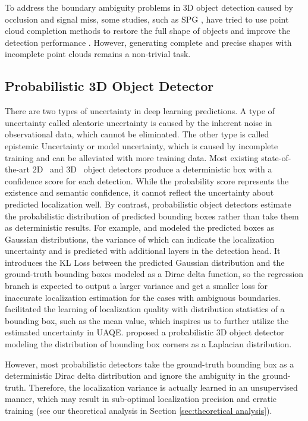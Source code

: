 \documentclass[twocolumn]{svjour3}
\begin{document}
To address the boundary ambiguity problems in 3D object detection caused by occlusion and signal miss, some studies, such as SPG \citep{Xu_2021_ICCV}, have tried to use point cloud completion methods to restore the full shape of objects and improve the detection performance \citep{yan2021sparse,Najibi_2020_CVPR}. However, generating complete and precise shapes with incomplete point clouds remains a non-trivial task.

\subsection{Probabilistic 3D Object Detector}
There are two types of uncertainty in deep learning predictions. A type of uncertainty called aleatoric uncertainty is caused by the inherent noise in observational data, which cannot be eliminated. The other type is called epistemic Uncertainty or model uncertainty, which is caused by incomplete training and can be alleviated with more training data.
Most existing state-of-the-art 2D~\citep{liu2016ssd,tan2020efficientdet,carion2020end} and 3D~\citep{shi2020points} object detectors produce a deterministic box with a confidence score for each detection. While the probability score represents the existence and semantic confidence, it cannot reflect the uncertainty about predicted localization well.
By contrast, probabilistic object detectors \citep{bbr,harakeh2020bayesod,varamesh2020mixture} estimate the probabilistic distribution of predicted bounding boxes rather than take them as deterministic results. For example, \cite{bbr} and \cite{Choi_2019_ICCV} modeled the predicted boxes as Gaussian distributions, the variance of which can indicate the localization uncertainty and is predicted with additional layers in the detection head. It introduces the KL Loss between the predicted Gaussian distribution and the ground-truth bounding boxes modeled as a Dirac delta function, so the regression branch is expected to output a larger variance and get a smaller loss for inaccurate localization estimation for the cases with ambiguous boundaries. 
\cite{li2021generalized} facilitated the learning of localization quality with distribution statistics of a bounding box, such as the mean value, which inspires us to further utilize the estimated uncertainty in UAQE.
\cite{LaserNet} proposed a probabilistic 3D object detector modeling the distribution of bounding box corners as a Laplacian distribution.

However, most probabilistic detectors take the ground-truth bounding box as a deterministic Dirac delta distribution and ignore the ambiguity in the ground-truth. 
Therefore, the localization variance is actually learned in an unsupervised manner, which may result in sub-optimal localization precision and erratic training (see our theoretical analysis in Section \ref{sec:theoretical analysis}).
\end{document}
